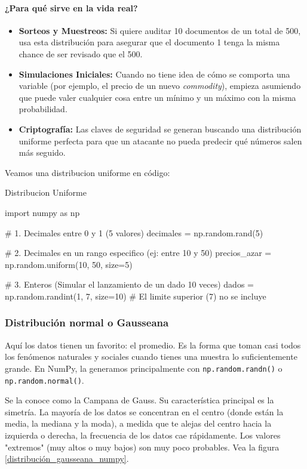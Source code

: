 \paragraph{¿Para qué sirve en la vida real?}
\begin{itemize}
\item \textbf{Sorteos y Muestreos:} Si quiere auditar 10 documentos de un total de 500, usa esta distribución para asegurar que el documento 1 tenga la misma chance de ser revisado que el 500.
\item \textbf{Simulaciones Iniciales:} Cuando no tiene idea de cómo se comporta una variable (por ejemplo, el precio de un nuevo \textit{commodity}), empieza asumiendo que puede valer cualquier cosa entre un mínimo y un máximo con la misma probabilidad.
\item \textbf{Criptografía:} Las claves de seguridad se generan buscando una distribución uniforme perfecta para que un atacante no pueda predecir qué números salen más seguido.
\end{itemize}

Veamos una distribucion uniforme en código:
\begin{pycode}{Distribucion Uniforme}

import numpy as np

# 1. Decimales entre 0 y 1 (5 valores)
decimales = np.random.rand(5)

# 2. Decimales en un rango especifico (ej: entre 10 y 50)
precios_azar = np.random.uniform(10, 50, size=5)

# 3. Enteros (Simular el lanzamiento de un dado 10 veces)
dados = np.random.randint(1, 7, size=10) # El limite superior (7) no se incluye
\end{pycode}




\subsubsection{Distribución normal o Gausseana}

Aquí los datos tienen un favorito: el promedio. Es la forma que toman casi todos los fenómenos naturales y sociales cuando tienes una muestra lo suficientemente grande. En NumPy, la generamos principalmente con \texttt{np.random.randn()} o \texttt{np.random.normal()}.

Se la conoce como la Campana de Gauss. Su característica principal es la simetría. La mayoría de los datos se concentran en el centro (donde están la media, la mediana y la moda), a medida que te alejas del centro hacia la izquierda o derecha, la frecuencia de los datos cae rápidamente. Los valores "extremos" (muy altos o muy bajos) son muy poco probables. Vea la figura \ref{distribución_gausseana_numpy}.


